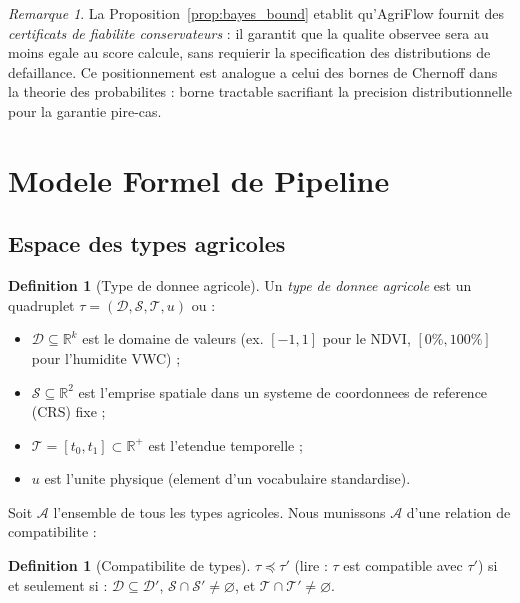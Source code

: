 \documentclass[12pt,a4paper]{article}
\theoremstyle{plain}
\theoremstyle{definition}
\newtheorem{definition}[theorem]{Definition}
\theoremstyle{remark}
\newtheorem{remark}[theorem]{Remarque}
\newcommand{\R}{\mathbb{R}}
\begin{document}
\begin{remark}
La Proposition~\ref{prop:bayes_bound} etablit qu'AgriFlow fournit des
\emph{certificats de fiabilite conservateurs} : il garantit que la
qualite observee sera au moins egale au score calcule, sans requierir
la specification des distributions de defaillance.
Ce positionnement est analogue a celui des bornes de Chernoff
dans la theorie des probabilites : borne tractable sacrifiant la
precision distributionnelle pour la garantie pire-cas.
\end{remark}

\section{Modele Formel de Pipeline}
\label{sec:formal}

\subsection{Espace des types agricoles}
\label{subsec:types}

\begin{definition}[Type de donnee agricole]
\label{def:type}
Un \emph{type de donnee agricole} est un quadruplet
$\tau = (\mathcal{D}, \mathcal{S}, \mathcal{T}, u)$ ou :
\begin{itemize}[noitemsep]
  \item $\mathcal{D} \subseteq \R^k$ est le domaine de valeurs
    (ex. $[-1,1]$ pour le NDVI, $[0\%,100\%]$ pour l'humidite VWC) ;
  \item $\mathcal{S} \subseteq \R^2$ est l'emprise spatiale dans un
    systeme de coordonnees de reference (CRS) fixe ;
  \item $\mathcal{T} = [t_0,t_1] \subset \R^+$ est l'etendue temporelle ;
  \item $u$ est l'unite physique (element d'un vocabulaire standardise).
\end{itemize}
\end{definition}

Soit $\mathcal{A}$ l'ensemble de tous les types agricoles.
Nous munissons $\mathcal{A}$ d'une relation de compatibilite :

\begin{definition}[Compatibilite de types]
\label{def:compat}
$\tau \preceq \tau'$ (lire : $\tau$ est compatible avec $\tau'$) si et
seulement si :
$\mathcal{D} \subseteq \mathcal{D}'$,
$\mathcal{S} \cap \mathcal{S}' \neq \varnothing$, et
$\mathcal{T} \cap \mathcal{T}' \neq \varnothing$.
\end{definition}
\end{document}
